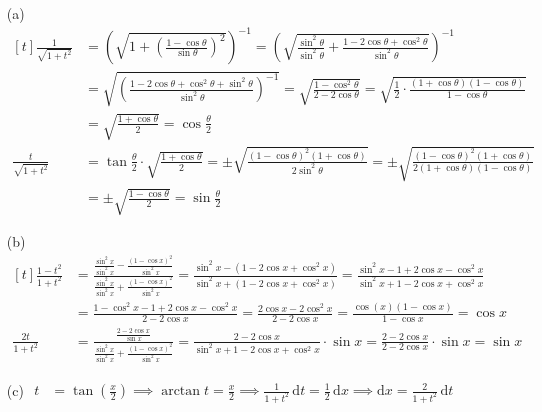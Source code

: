 \documentclass{article}
\begin{document}
\begin{itemize}
	\item[(a)]
		$\begin{aligned}[t]
		    \frac{1}{\sqrt{1+t^2}}
			&=\left(\sqrt{1+\left(\frac{1-\cos\theta}{\sin\theta}\right)^2}\right)^{-1}
			=\left(\sqrt{\frac{\sin^2\theta}{\sin^2\theta}+\frac{1-2\cos\theta+\cos^2\theta}{\sin^2\theta}}\right)^{-1} \\
			&=\sqrt{\left(\frac{1-2\cos\theta+\cos^2\theta+\sin^2\theta}{\sin^2\theta}\right)^{-1}}
			=\sqrt{\frac{1-\cos^2\theta}{2-2\cos\theta}}
			=\sqrt{\frac12\cdot \frac{(1+\cos\theta)(1-\cos\theta)}{1-\cos\theta}} \\
			&=\sqrt{\frac{1+\cos\theta}{2}}
			=\cos \frac{\theta}{2} \\
		    \frac{t}{\sqrt{1+t^2}}
			&=\tan \frac{\theta}{2}\cdot \sqrt{\frac{1+\cos\theta}{2}}
			=\pm\sqrt{\frac{(1-\cos\theta)^2(1+\cos\theta)}{2\sin^2\theta}}
			=\pm\sqrt{\frac{(1-\cos\theta)^2(1+\cos\theta)}{2(1+\cos\theta)(1-\cos\theta)}} \\
			&=\pm\sqrt{\frac{1-\cos\theta}{2}}
			=\sin \frac{\theta}{2}
		\end{aligned}$

	\item[(b)]
		$\begin{aligned}[t]
		    \frac{1-t^2}{1+t^2}
			&=\frac{\displaystyle\frac{\sin^2 x}{\sin^2 x}-\frac{(1-\cos  x)^2}{\sin^2 x}}{\displaystyle\frac{\sin^2 x}{\sin^2 x}+\frac{(1-\cos x)^2}{\sin^2 x}}
			=\frac{\sin^2 x-\left(1-2\cos x+\cos^2 x\right)}{\sin^2 x+\left(1-2\cos x+\cos^2 x\right)}
			=\frac{\sin^2 x-1+2\cos x-\cos^2 x}{\sin^2 x+1-2\cos x+\cos^2 x} \\
			&=\frac{1-\cos^2 x-1+2\cos x-\cos^2 x}{2-2\cos x} 
			=\frac{2\cos x-2\cos^2 x}{2-2\cos x} 
			=\frac{\cos( x)(1-\cos x)}{1-\cos x}
			=\cos x \\
			\frac{2t}{1+t^2}
			&=\frac{\displaystyle \frac{2-2\cos x}{\sin x}}{\displaystyle \frac{\sin^2 x}{\sin^2 x}+\frac{(1-\cos x)^2}{\sin^2 x}}
			=\frac{2-2\cos x}{\sin^2x+1-2\cos x+\cos^2x}\cdot\sin x
			=\frac{2-2\cos x}{2-2\cos x}\cdot\sin x
			=\sin x
		\end{aligned}$

	\item[(c)]
		$\begin{aligned}
			t&=\tan \left(\frac x2\right)
			\implies\arctan t=\frac x2
			\implies\frac{1}{1+t^2}\,\mathrm{d}t=\frac12 \,\mathrm{d}x
			\implies\mathrm{d}x=\frac{2}{1+t^2}\,\mathrm{d}t
		\end{aligned}$
\end{itemize}
\end{document}
